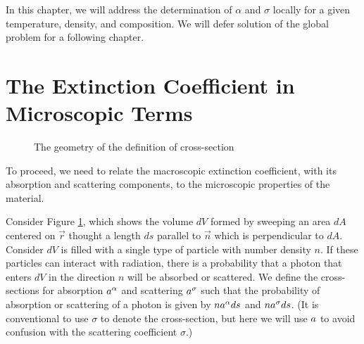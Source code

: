 In this chapter, we will address the determination of $\alpha$ and $\sigma$ locally for a given temperature, density, and composition. We will defer solution of the global problem for a following chapter.

\newslide

\section{The Extinction Coefficient in Microscopic Terms}

\begin{figure}
\begin{center}
\end{center}
\caption{The geometry of the definition of cross-section}
\label{fig-cross-section}
\end{figure}

To proceed, we need to relate the macroscopic extinction coefficient, with its absorption and scattering components, to the microscopic properties of the material. 

Consider Figure \ref{fig-cross-section}, which shows the
volume $dV$ formed by sweeping an area $dA$ centered on
$\vec r$ thought a length $ds$ parallel to $\vec n$ which is
perpendicular to $dA$. Consider $dV$ is filled with a single type of particle with number density $n$. If these particles can interact with radiation, there is a probability that a photon that enters $dV$ in the direction $n$ will be absorbed or scattered. We define the cross-sections for absorption $a^\alpha$ and scattering $a^\sigma$ such that the probability of absorption or scattering of a photon is given by $n a^\alpha ds$ and $na^\sigma ds$. (It is conventional to use $\sigma$ to denote the cross-section, but here we will use $a$ to avoid confusion with the scattering coefficient $\sigma$.)


